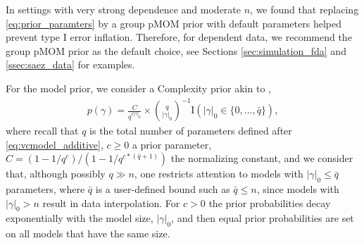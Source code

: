 
In settings with very strong dependence and moderate $n$,  we found that replacing \eqref{eq:prior_paramters} by a group pMOM prior with default parameters \citep{rossell:2021} helped prevent type I error inflation. Therefore, for dependent data, we recommend the group pMOM prior as the default choice, see Sections \ref{sec:simulation_fda} and \ref{ssec:saez_data} for examples.


For the model prior, we consider a Complexity prior akin to \cite{castillo:2015}, 
\begin{align}
p(\gamma)=
\frac{C}{q^{c |\gamma|_0}} \times {q \choose |\gamma|_0}^{-1} \mbox{I}(|\gamma|_0 \in \{0,\ldots,\bar{q}\}),
\label{eq:prior_modelsize}
\end{align}
where recall that $q$ is the total number of parameters defined after \eqref{eq:vcmodel_additive}, $c \geq 0$ a prior parameter, $C=(1 - 1/q^c) / (1-1/q^{c*(\bar{q}+1)})$ the normalizing constant,
and we consider that, although possibly $q \gg n$, one restricts attention to models with $|\gamma|_0 \leq \bar{q}$ parameters, where $\bar{q}$ is a user-defined bound such as $\bar{q} \leq n$, since models with $|\gamma|_0 > n$ result in data interpolation.
For $c>0$ the prior probabilities decay exponentially with the model size, $|\gamma|_0$, and then equal prior probabilities are set on  all models that have the same size.

